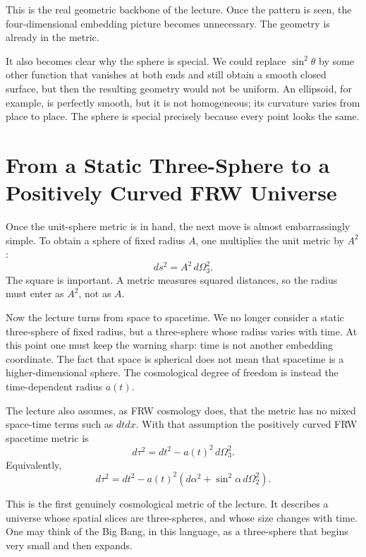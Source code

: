 This is the real geometric backbone of the lecture. Once the pattern is seen, the four-dimensional embedding picture becomes unnecessary. The geometry is already in the metric.

It also becomes clear why the sphere is special. We could replace \(\sin^2\theta\) by some other function that vanishes at both ends and still obtain a smooth closed surface, but then the resulting geometry would not be uniform. An ellipsoid, for example, is perfectly smooth, but it is not homogeneous; its curvature varies from place to place. The sphere is special precisely because every point looks the same.

\section{From a Static Three-Sphere to a Positively Curved FRW Universe}

Once the unit-sphere metric is in hand, the next move is almost embarrassingly simple. To obtain a sphere of fixed radius \(A\), one multiplies the unit metric by \(A^2\):
\begin{equation}
ds^2=A^2\,d\Omega_3^2.
\end{equation}
The square is important. A metric measures squared distances, so the radius must enter as \(A^2\), not as \(A\).

Now the lecture turns from space to spacetime. We no longer consider a static three-sphere of fixed radius, but a three-sphere whose radius varies with time. At this point one must keep the warning sharp: time is not another embedding coordinate. The fact that space is spherical does not mean that spacetime is a higher-dimensional sphere. The cosmological degree of freedom is instead the time-dependent radius \(a(t)\).

The lecture also assumes, as FRW cosmology does, that the metric has no mixed space-time terms such as \(dtdx\). With that assumption the positively curved FRW spacetime metric is
\begin{equation}
d\tau^2=dt^2-a(t)^2\,d\Omega_3^2.
\end{equation}
Equivalently,
\begin{equation}
d\tau^2=dt^2-a(t)^2\left(d\alpha^2+\sin^2\alpha\,d\Omega_2^2\right).
\end{equation}

This is the first genuinely cosmological metric of the lecture. It describes a universe whose spatial slices are three-spheres, and whose size changes with time. One may think of the Big Bang, in this language, as a three-sphere that begins very small and then expands.

